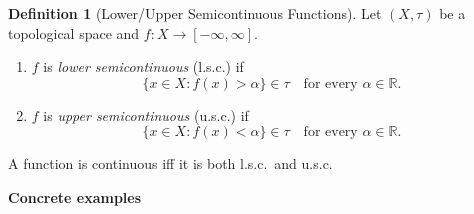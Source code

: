 \documentclass[12pt]{article}
\title{}
\author{Jerich Lee}
\date{\today}
\theoremstyle{definition} %
\newtheorem{definition}{Definition}
\theoremstyle{plain} %
\begin{document}
\maketitle

\begin{definition}[Lower/Upper Semicontinuous Functions]\label{def:lsc-usc}
  Let $(X,\tau)$ be a topological space and $f\colon X\to[-\infty,\infty]$.
  \begin{enumerate}
      \item $f$ is \emph{lower semicontinuous} (l.s.c.) if 
            \[
                \{x\in X : f(x)>\alpha\}\in\tau \quad
                \text{for every }\alpha\in\mathbb{R}.
            \]
      \item $f$ is \emph{upper semicontinuous} (u.s.c.) if 
            \[
                \{x\in X : f(x)<\alpha\}\in\tau \quad
                \text{for every }\alpha\in\mathbb{R}.
            \]
  \end{enumerate}
  A function is continuous iff it is both l.s.c.\ and u.s.c.
  \end{definition}
  
  \medskip
  \noindent\textbf{Concrete examples}
  
\end{document}
